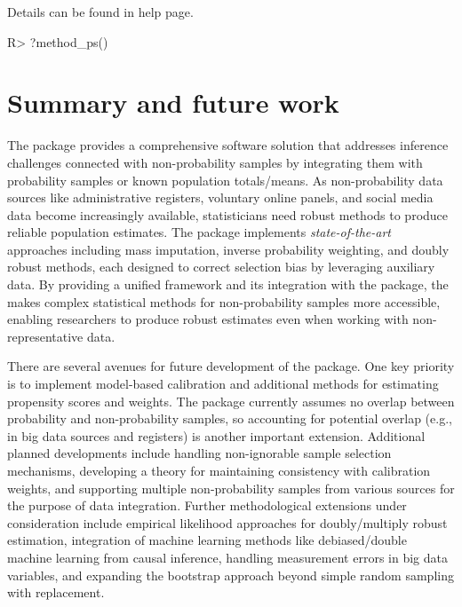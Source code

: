\documentclass[
]{jss}
\begin{document}
Details can be found in help page.

\begin{CodeChunk}
\begin{CodeInput}
R> ?method_ps()
\end{CodeInput}
\end{CodeChunk}

\section{Summary and future work}\label{summary-and-future-work}

The  package provides a comprehensive 
software solution that addresses inference challenges connected with
non-probability samples by integrating them with probability samples or
known population totals/means. As non-probability data sources like
administrative registers, voluntary online panels, and social media data
become increasingly available, statisticians need robust methods to
produce reliable population estimates. The package implements
\textit{state-of-the-art} approaches including mass imputation, inverse
probability weighting, and doubly robust methods, each designed to
correct selection bias by leveraging auxiliary data. By providing a
unified framework and its integration with the  package, the
 makes complex statistical methods for non-probability
samples more accessible, enabling researchers to produce robust
estimates even when working with non-representative data.

There are several avenues for future development of the 
package. One key priority is to implement model-based calibration and
additional methods for estimating propensity scores and weights. The
package currently assumes no overlap between probability and
non-probability samples, so accounting for potential overlap (e.g., in
big data sources and registers) is another important extension.
Additional planned developments include handling non-ignorable sample
selection mechanisms, developing a theory for maintaining consistency
with calibration weights, and supporting multiple non-probability
samples from various sources for the purpose of data integration.
Further methodological extensions under consideration include empirical
likelihood approaches for doubly/multiply robust estimation, integration
of machine learning methods like debiased/double machine learning from
causal inference, handling measurement errors in big data variables, and
expanding the bootstrap approach beyond simple random sampling with
replacement.
\end{document}
